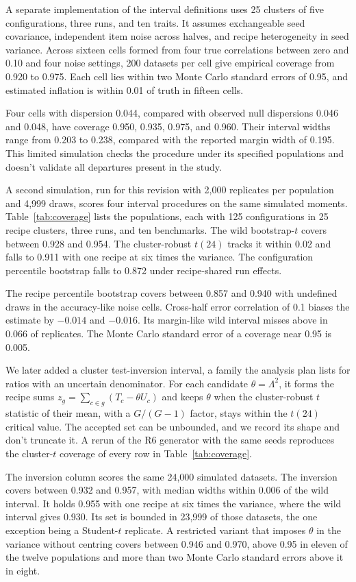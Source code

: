 A separate implementation of the interval definitions uses 25 clusters of five configurations, three runs, and ten traits. It assumes exchangeable seed covariance, independent item noise across halves, and recipe heterogeneity in seed variance. Across sixteen cells formed from four true correlations between zero and 0.10 and four noise settings, 200 datasets per cell give empirical coverage from 0.920 to 0.975. Each cell lies within two Monte Carlo standard errors of 0.95, and estimated inflation is within 0.01 of truth in fifteen cells.

Four cells with dispersion 0.044, compared with observed null dispersions 0.046 and 0.048, have coverage 0.950, 0.935, 0.975, and 0.960. Their interval widths range from 0.203 to 0.238, compared with the reported margin width of 0.195. This limited simulation checks the procedure under its specified populations and doesn't validate all departures present in the study.

A second simulation, run for this revision with 2,000 replicates per population and 4,999 draws, scores four interval procedures on the same simulated moments. Table~\ref{tab:coverage} lists the populations, each with 125 configurations in 25 recipe clusters, three runs, and ten benchmarks. The wild bootstrap-$t$ covers between 0.928 and 0.954. The cluster-robust $t(24)$ tracks it within 0.02 and falls to 0.911 with one recipe at six times the variance. The configuration percentile bootstrap falls to 0.872 under recipe-shared run effects.

The recipe percentile bootstrap covers between 0.857 and 0.940 with undefined draws in the accuracy-like noise cells. Cross-half error correlation of 0.1 biases the estimate by $-0.014$ and $-0.016$. Its margin-like wild interval misses above in 0.066 of replicates. The Monte Carlo standard error of a coverage near 0.95 is 0.005.

We later added a cluster test-inversion interval, a family the analysis plan lists for ratios with an uncertain denominator. For each candidate $\theta=\Lambda^2$, it forms the recipe sums $z_g=\sum_{c\in g}(T_c-\theta U_c)$ and keeps $\theta$ when the cluster-robust $t$ statistic of their mean, with a $G/(G-1)$ factor, stays within the $t(24)$ critical value. The accepted set can be unbounded, and we record its shape and don't truncate it. A rerun of the R6 generator with the same seeds reproduces the cluster-$t$ coverage of every row in Table~\ref{tab:coverage}.

The inversion column scores the same 24,000 simulated datasets. The inversion covers between 0.932 and 0.957, with median widths within 0.006 of the wild interval. It holds 0.955 with one recipe at six times the variance, where the wild interval gives 0.930. Its set is bounded in 23,999 of those datasets, the one exception being a Student-$t$ replicate. A restricted variant that imposes $\theta$ in the variance without centring covers between 0.946 and 0.970, above 0.95 in eleven of the twelve populations and more than two Monte Carlo standard errors above it in eight.

